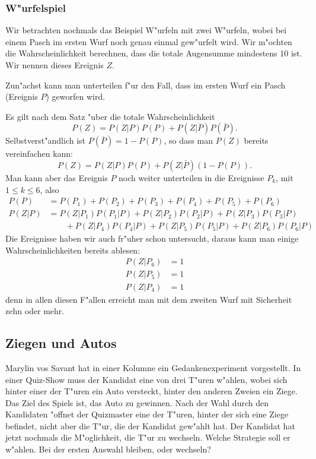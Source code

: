 \subsubsection{W"urfelspiel}
Wir betrachten nochmals das Beispiel W"urfeln mit zwei W"urfeln, wobei
bei einem Pasch im ersten Wurf noch genau einmal gew"urfelt wird.
Wir m"ochten die Wahrscheinlichkeit berechnen, dass die totale Augensumme
mindestens 10 ist.
Wir nennen dieses Ereignis $Z$.

Zun"achst kann man unterteilen f"ur den Fall, dass im ersten Wurf
ein Pasch (Ereignis $P$) geworfen wird.

Es gilt nach dem Satz "uber die totale Wahrscheinlichkeit
\[
P(Z) = P(Z|P) P(P) + P(Z|\bar P) P(\bar P).
\]
Selbstverst"andlich ist $P(\bar P)=1-P(P)$, so dass man $P(Z)$ bereits
vereinfachen kann:
\[
P(Z) = P(Z|P) P(P) + P(Z|\bar P) (1-P(P)).
\]
Man kann aber das Ereignis $P$ noch weiter unterteilen in die
Ereignisse $P_k$, mit $1\le k\le 6$, also
\begin{align*}
P(P)&=
P(P_1)+
P(P_2)+
P(P_3)+
P(P_4)+
P(P_5)+
P(P_6)
\\
P(Z|P)
&=
P(Z|P_1)P(P_1|P)+
P(Z|P_2)P(P_2|P)+
P(Z|P_3)P(P_3|P)
\\
&\qquad +
P(Z|P_4)P(P_4|P)+
P(Z|P_5)P(P_5|P)+
P(Z|P_6)P(P_6|P)
\end{align*}
Die Ereignisse haben wir auch fr"uher schon untersucht, daraus kann
man einige Wahrscheinlichkeiten bereits ablesen:
\begin{align*}
P(Z|P_6)&=1\\
P(Z|P_5)&=1\\
P(Z|P_4)&=1
\end{align*}
denn in allen diesen F"allen erreicht man mit dem zweiten Wurf mit
Sicherheit zehn oder mehr.

\subsection{Ziegen und Autos} \label{ziegen:autos}
Marylin vos Savant hat in einer Kolumne ein Gedankenexperiment vorgestellt.
In einer Quiz-Show muss der Kandidat eine von drei T"uren w"ahlen, wobei
sich hinter einer der T"uren ein Auto versteckt, hinter den anderen Zweien
ein Ziege.
Das Ziel des Spiels ist, das Auto zu gewinnen.
Nach der Wahl
durch den Kandidaten "offnet der Quizmaster eine der T"uren, hinter der sich
eine Ziege befindet, nicht aber die T"ur, die der Kandidat gew"ahlt hat.
Der Kandidat hat jetzt nochmals die M"oglichkeit, die T"ur zu wechseln.
Welche Strategie soll er w"ahlen.
Bei der ersten Auswahl bleiben, oder
wechseln?


